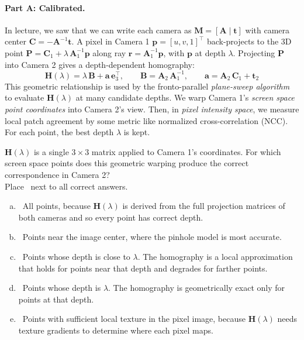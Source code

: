 \documentclass{csci1430}
\begin{document}
\pagebreak

\paragraph{Part A: Calibrated.}
In lecture, we saw that we can write each camera as $\mathbf{M} = [\mathbf{A} \;|\; \mathbf{t}]$ with camera center $\mathbf{C} = -\mathbf{A}^{-1}\mathbf{t}$. A pixel in Camera 1 $\mathbf{p} = [u, v, 1]^\top$ back-projects to the 3D point $\mathbf{P} = \mathbf{C}_\text{1} + \lambda\, \mathbf{A}_\text{1}^{-1}\mathbf{p}$ along ray $\mathbf{r}=\mathbf{A}_\text{1}^{-1}\mathbf{p}$, with $\mathbf{p}$ at depth $\lambda$. Projecting $\mathbf{P}$ into Camera 2 gives a depth-dependent homography:
%
\begin{equation*}
\mathbf{H}(\lambda) = \lambda\, \mathbf{B} + \mathbf{a}\, \mathbf{e}_3^\top, \qquad \mathbf{B} = \mathbf{A}_\text{2}\, \mathbf{A}_\text{1}^{-1}, \qquad \mathbf{a} = \mathbf{A}_\text{2}\, \mathbf{C}_\text{1} + \mathbf{t}_\text{2}
\end{equation*}
%
This geometric relationship is used by the fronto-parallel \emph{plane-sweep algorithm} to evaluate $\mathbf{H}(\lambda)$ at many candidate depths. We warp Camera 1's \emph{screen space point coordinates} into Camera 2's view. Then, in \emph{pixel intensity space}, we measure local patch agreement by some metric like normalized cross-correlation (NCC). For each point, the best depth $\lambda$ is kept.

\begin{subquestion}[points=2]
$\mathbf{H}(\lambda)$ is a single $3\times3$ matrix applied to Camera 1's coordinates. For which screen space points does this geometric warping produce the correct correspondence in Camera 2? \\
Place \filled~next to all correct answers.
\end{subquestion}

\begin{answer}[height=11]
\begin{enumerate}[(a),leftmargin=12pt]
\item \cbox~All points, because $\mathbf{H}(\lambda)$ is derived from the full projection matrices of both cameras and so every point has correct depth.
\item \cbox~Points near the image center, where the pinhole model is most accurate.
\item \cbox~Points whose depth is close to $\lambda$. The homography is a local approximation that holds for points near that depth and degrades for farther points.
\item \cbox~Points whose depth is $\lambda$. The homography is geometrically exact only for points at that depth.
\item \cbox~Points with sufficient local texture in the pixel image, because $\mathbf{H}(\lambda)$ needs texture gradients to determine where each pixel maps.
\end{enumerate}
\end{answer}
\end{document}
